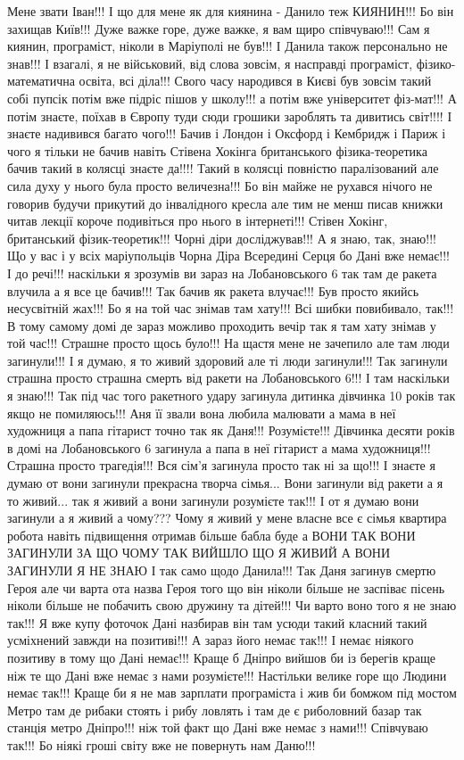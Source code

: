 Мене звати Іван!!!  І що для мене як для киянина - Данило теж КИЯНИН!!! Бо він
захищав Київ!!! Дуже важке горе, дуже важке, я вам щиро співчуваю!!!  Сам я
киянин, програміст, ніколи в Маріуполі не був!!! І Данила також персонально не
знав!!!  І взагалі, я не військовий, від слова зовсім, я насправді програміст,
фізико-математична освіта, всі діла!!! Свого часу народився в Києві був зовсім
такий собі пупсік потім вже підріс пішов у школу!!!  а потім вже університет
фіз-мат!!! А потім знаєте, поїхав в Європу туди сюди грошики зароблять та
дивитись світ!!!!  І знаєте надивився багато чого!!! Бачив і Лондон і Оксфорд і
Кембридж і Париж і чого я тільки не бачив навіть Стівена Хокінга британського
фізика-теоретика бачив такий в колясці знаєте да!!!! Такий в колясці повністю
паралізований але сила духу у нього була просто величезна!!! Бо він майже не
рухався нічого не говорив будучи прикутий до інвалідного кресла але тим не менш
писав книжки читав лекції короче подивіться про нього в інтернеті!!! Стівен
Хокінг, британський фізик-теоретик!!! Чорні діри досліджував!!!  А я знаю, так,
знаю!!!  Що у вас і у всіх маріупольців Чорна Діра Всередині Серця бо Дані вже
немає!!! І до речі!!! наскільки я зрозумів ви зараз на Лобановського 6 так там де
ракета влучила а я все це бачив!!! Так бачив як ракета влучає!!! Був просто
якийсь несусвітній жах!!!  Бо я на той час знімав там хату!!! Всі шибки
повибивало, так!!! В тому самому домі де зараз можливо проходить вечір так я
там хату знімав у той час!!! Страшне просто щось було!!! На щастя мене не
зачепило але там люди загинули!!! І я думаю, я то живий здоровий але ті люди
загинули!!! Так загинули страшна просто страшна смерть від ракети на
Лобановського 6!!! І там наскільки я знаю!!! Так
під час того ракетного удару загинула дитинка дівчинка 10 років так якщо не
помиляюсь!!! Аня її звали вона любила малювати а мама в неї художниця а папа
гітарист точно так як Даня!!!  Розумієте!!! Дівчинка десяти років в домі на
Лобановського 6 загинула а папа в неї гітарист а мама художниця!!!  Страшна
просто трагедія!!! Вся сім'я загинула просто так ні за що!!! І знаєте я думаю
от вони загинули прекрасна творча сімья...  Вони загинули від ракети а я то
живий... так я живий а вони загинули розумієте так!!! І от я думаю вони
загинули а я живий а чому???  Чому я живий у мене власне все є сімья квартира
робота навіть підвищення отримав більше бабла буде а ВОНИ ТАК ВОНИ ЗАГИНУЛИ ЗА
ЩО ЧОМУ ТАК ВИЙШЛО ЩО Я ЖИВИЙ А ВОНИ ЗАГИНУЛИ Я НЕ ЗНАЮ І так само щодо
Данила!!! Так Даня загинув смертю Героя але чи варта ота назва Героя того що
він ніколи більше не заспіває пісень ніколи більше не побачить свою дружину та
дітей!!! Чи варто воно того я не знаю так!!! Я вже купу фоточок Дані назбирав
він там усюди такий класний такий усміхнений завжди на позитиві!!!  А зараз
його немає так!!! І немає ніякого позитиву в тому що Дані немає!!! Краще б
Дніпро вийшов би із берегів краще ніж те що Дані вже немає з нами розумієте!!!
Настільки велике горе що Людини немає так!!! Краще би я не мав зарплати
програміста і жив би бомжом під мостом Метро там де рибаки стоять і рибу
ловлять і там де є риболовний базар так станція метро Дніпро!!! ніж той факт що
Дані вже немає з нами!!! Співчуваю так!!! Бо ніякі гроші світу вже не повернуть
нам Даню!!!

